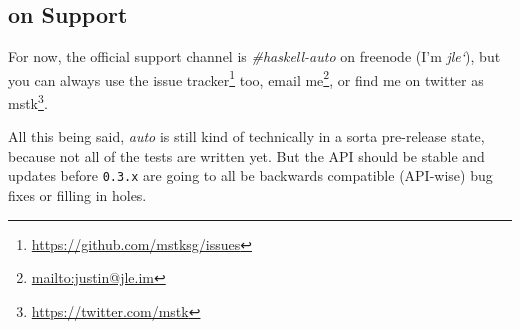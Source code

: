 \documentclass[]{article}
\renewcommand{\href}[2]{#2\footnote{\url{#1}}}
\begin{document}
\subsection{on Support}\label{on-support}

For now, the official support channel is \emph{\#haskell-auto} on
freenode (I'm \emph{jle`}), but you can always use the
\href{https://github.com/mstksg/issues}{issue tracker} too,
\href{mailto:justin@jle.im}{email me}, or find me on twitter as
\href{https://twitter.com/mstk}{mstk}.

All this being said, \emph{auto} is still kind of technically in a sorta
pre-release state, because not all of the tests are written yet. But the
API should be stable and updates before \texttt{0.3.x} are going to all
be backwards compatible (API-wise) bug fixes or filling in holes.
\end{document}
